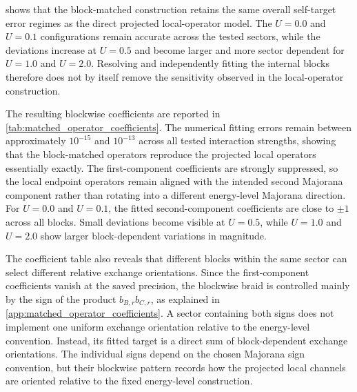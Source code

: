  shows that the block-matched construction retains the same overall self-target error regimes as the direct projected local-operator model. The $U=0.0$ and $U=0.1$ configurations remain accurate across the tested sectors, while the deviations increase at $U=0.5$ and become larger and more sector dependent for $U=1.0$ and $U=2.0$. Resolving and independently fitting the internal blocks therefore does not by itself remove the sensitivity observed in the local-operator construction.

The resulting blockwise coefficients are reported in \cref{tab:matched_operator_coefficients}. The numerical fitting errors remain between approximately $10^{-15}$ and $10^{-13}$ across all tested interaction strengths, showing that the block-matched operators reproduce the projected local operators essentially exactly. The first-component coefficients are strongly suppressed, so the local endpoint operators remain aligned with the intended second Majorana component rather than rotating into a different energy-level Majorana direction. For $U=0.0$ and $U=0.1$, the fitted second-component coefficients are close to $\pm1$ across all blocks. Small deviations become visible at $U=0.5$, while $U=1.0$ and $U=2.0$ show larger block-dependent variations in magnitude.

The coefficient table also reveals that different blocks within the same sector can select different relative exchange orientations. Since the first-component coefficients vanish at the saved precision, the blockwise braid is controlled mainly by the sign of the product $b_{B,r}b_{C,r}$, as explained in \cref{app:matched_operator_coefficients}. A sector containing both signs does not implement one uniform exchange orientation relative to the energy-level convention. Instead, its fitted target is a direct sum of block-dependent exchange orientations. The individual signs depend on the chosen Majorana sign convention, but their blockwise pattern records how the projected local channels are oriented relative to the fixed energy-level construction.

